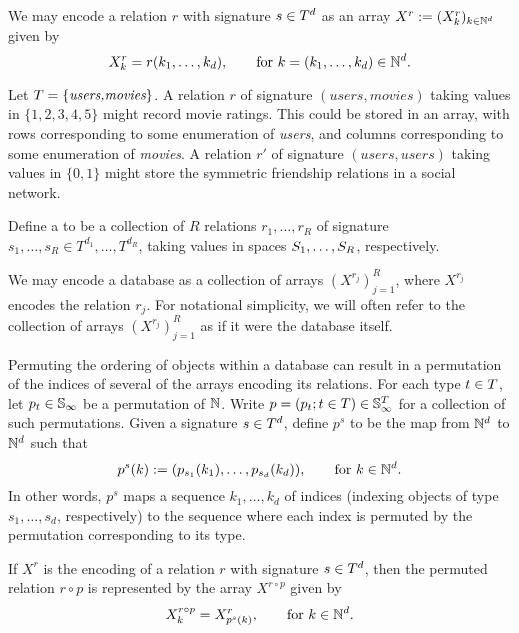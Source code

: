 We may encode a relation $r$ with signature $s \in T^d$ as an array $X^r := (X^r_{k})_{k \in \mathbb{N}^d}$ given by
\[
X^r_{k} = r(k_1,\dotsc,k_d), \qquad \text{for } k = (k_1,\dotsc, k_d) \in \mathbb{N}^d.
\]

\begin{example} 
Let $T = \{\textit{users,movies}\}$.
A relation $r$ of signature $(\textit{users},\textit{movies})$ taking values in $\{1,2,3,4,5\}$ might record movie ratings.
This could be stored in an array, with rows corresponding to some enumeration of \textit{users}, and columns corresponding to some enumeration of \textit{movies}. 
A relation $r'$ of signature $(\textit{users},\textit{users})$ taking values in $\{0,1\}$ might store the symmetric friendship relations in a social network.
\end{example}

\begin{definition}[database]
Define a  to be a collection of $R$ relations $r_1,\dotsc,r_R$ of signature $s_1,\dotsc,s_R \in T^{d_1},\dotsc,T^{d_R}$, taking values in spaces $S_1,\dotsc,S_R$, respectively.
\end{definition}

We may encode a database as a collection of arrays $(X^{r_j})_{j=1}^R$, where $X^{r_j}$ encodes the relation $r_j$.  
For notational simplicity, we will often refer to the collection of arrays $(X^{r_j})_{j=1}^R$ as if it were the database itself.

Permuting the ordering of objects within a database can result in a permutation of the indices of several of the arrays encoding its relations.
For each type $t \in T$, let $p_t \in \mathbb{S}_{\infty}$ be a permutation of $\mathbb{N}$. 
Write $p = (p_t ; t \in T) \in \mathbb{S}_{\infty}^T$ for a collection of such permutations.
Given a signature $s \in T^{d}$, define $p^s$ to be the map from $\mathbb{N}^{d}$ to $\mathbb{N}^{d}$ such that
\[
p^s(k) := (p_{s_1}(k_1), \dotsc,p_{s_{d}}(k_{d})), \qquad \text{for } k \in \mathbb{N}^{d}.
\]
In other words, $p^s$ maps a sequence $k_1,\dotsc,k_d$ of indices (indexing objects of type $s_1,\dotsc,s_d$, respectively) to the sequence where each index is permuted by the permutation corresponding to its type.

If $X^r$ is the encoding of a relation $r$ with signature $s \in T^d$, then the permuted relation $r \circ p$ is represented by the array $X^{r\circ p}$ given by
\[
X^{r \circ p}_{k} = X^r_{p^s(k)}, \qquad \text{for } k \in \mathbb{N}^d.
\]

